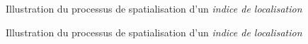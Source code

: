 \begin{figure}[h]
  \centering
  
  \caption{Illustration du processus de spatialisation d'un
    \emph{indice de localisation}}
  \label{fig:obj_spa}
\end{figure}


\begin{figure}[h]
  \centering
  
  \caption{Illustration du processus de spatialisation d'un
    \emph{indice de localisation}}
  \label{fig:obj_spa}
\end{figure}

